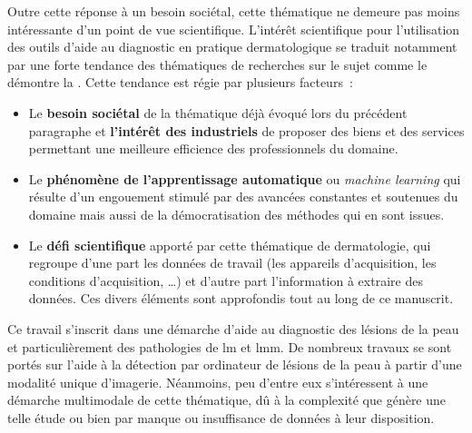 Outre cette réponse à un besoin sociétal, cette thématique ne demeure pas moins intéressante d’un point de vue scientifique. L’intérêt scientifique pour l'utilisation des outils d'aide au diagnostic en pratique dermatologique se traduit notamment par une forte tendance des thématiques de recherches sur le sujet comme le démontre la . Cette tendance est régie par plusieurs facteurs~:
\begin{itemize}
    \item Le \textbf{besoin sociétal} de la thématique déjà évoqué lors du précédent paragraphe et \textbf{l'intérêt des industriels} de proposer des biens et des services permettant une meilleure efficience des professionnels du domaine.
    \item Le \textbf{phénomène de l'apprentissage automatique} ou \textit{machine learning} qui résulte d'un engouement stimulé par des avancées constantes et soutenues du domaine mais aussi de la démocratisation des méthodes qui en sont issues. 
    \item Le \textbf{défi scientifique} apporté par cette thématique de dermatologie, qui regroupe d'une part les données de travail (les appareils d'acquisition, les conditions d'acquisition, \ldots) et d'autre part l'information à extraire des données. Ces divers éléments sont approfondis tout au long de ce manuscrit.
\end{itemize}\par
\clearpage

Ce travail s'inscrit dans une démarche d'aide au diagnostic des lésions de la peau et particulièrement des pathologies de \gls{lm} et \gls{lmm}. De nombreux travaux se sont portés sur l'aide à la détection par ordinateur de lésions de la peau à partir d'une modalité unique d'imagerie. Néanmoins, peu d'entre eux s'intéressent à une démarche multimodale de cette thématique, dû à la complexité que génère une telle étude ou bien par manque ou insuffisance de données à leur disposition.\par

